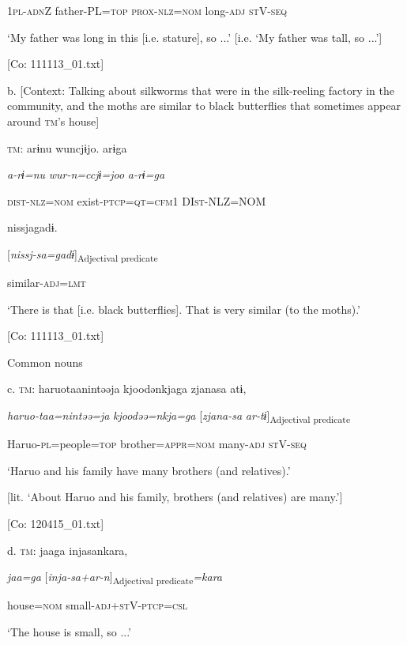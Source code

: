       1\textsc{pl}-\textsc{adn}Z  father{}-PL=\textsc{top}  \textsc{prox}-\textsc{nlz}=\textsc{nom}  long{}-\textsc{adj}  \textsc{st}V-\textsc{seq}

      ‘My father was long in this [i.e. stature], so ...’ [i.e. ‘My father was tall, so ...’]

      [Co: 111113\_01.txt]

  b.  [Context: Talking about silkworms that were in the silk-reeling factory in the community, and the moths are similar to black butterflies that sometimes appear around \textsc{tm}’s house]

    \textsc{tm}:  arɨnu  wuncjɨjo.  arɨga

      \textit{a-rɨ=nu}  \textit{wur-n=ccjɨ=joo}  \textit{a-rɨ=ga}

      \textsc{dist}-\textsc{nlz}=\textsc{nom}  exist-\textsc{ptcp}=\textsc{qt}=\textsc{cfm}1  DI\textsc{st}-NLZ=NOM

      nissjagadɨ.

      [\textit{nissj-sa=gadɨ}]\textsubscript{Adjectival predicate}

      similar-\textsc{adj}=\textsc{lmt}

      ‘There is that [i.e. black butterflies]. That is very similar (to the moths).’

      [Co: 111113\_01.txt]

  Common nouns

  c.  \textsc{tm}:  haruotaanintəəja  kjoodənkjaga  zjanasa  atɨ,

      \textit{haruo-taa=nintəə=ja}  \textit{kjoodəə=nkja=ga}  [\textit{zjana-sa}  \textit{ar-tɨ}]\textsubscript{Adjectival predicate}

      Haruo-\textsc{pl}=people=\textsc{top}  brother=\textsc{appr}=\textsc{nom}  many-\textsc{adj}  \textsc{st}V-\textsc{seq}

      ‘Haruo and his family have many brothers (and relatives).’ 

[lit. ‘About Haruo and his family, brothers (and relatives) are many.’]

      [Co: 120415\_01.txt]

  d.  \textsc{tm}:  jaaga  injasankara,

      \textit{jaa=ga}  [\textit{inja-sa+ar-n}]\textsubscript{Adjectival predicate}\textit{=kara}

      house=\textsc{nom}  small-\textsc{adj}+\textsc{st}V-\textsc{ptcp}=\textsc{csl}

      ‘The house is small, so ...’

